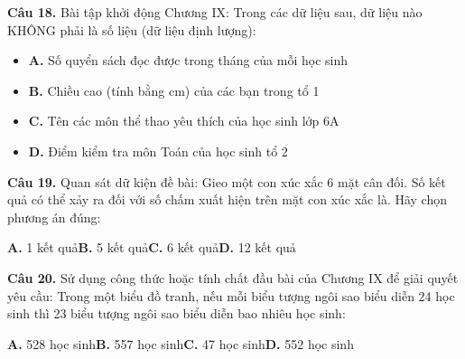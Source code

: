 \documentclass[11pt,a4paper]{article}
\begin{document}
\textbf{\color{primary} Câu 18.} Bài tập khởi động Chương IX: Trong các dữ liệu sau, dữ liệu nào KHÔNG phải là số liệu (dữ liệu định lượng):\par
\begin{itemize}\setlength{\itemsep}{1pt}\setlength{\parskip}{0pt}
  \item[] \textbf{A.} Số quyển sách đọc được trong tháng của mỗi học sinh
  \item[] \textbf{B.} Chiều cao (tính bằng cm) của các bạn trong tổ 1
  \item[] \textbf{C.} Tên các môn thể thao yêu thích của học sinh lớp 6A
  \item[] \textbf{D.} Điểm kiểm tra môn Toán của học sinh tổ 2
\end{itemize}\vspace{2pt}
\textbf{\color{primary} Câu 19.} Quan sát dữ kiện đề bài: Gieo một con xúc xắc 6 mặt cân đối. Số kết quả có thể xảy ra đối với số chấm xuất hiện trên mặt con xúc xắc là. Hãy chọn phương án đúng:\par
\hspace*{1.5em}\textbf{A.} 1 kết quả\quad\quad \textbf{B.} 5 kết quả\quad\quad \textbf{C.} 6 kết quả\quad\quad \textbf{D.} 12 kết quả\par\vspace{2pt}
\textbf{\color{primary} Câu 20.} Sử dụng công thức hoặc tính chất đầu bài của Chương IX để giải quyết yêu cầu: Trong một biểu đồ tranh, nếu mỗi biểu tượng ngôi sao biểu diễn 24 học sinh thì 23 biểu tượng ngôi sao biểu diễn bao nhiêu học sinh:\par
\hspace*{1.5em}\textbf{A.} 528 học sinh\quad\quad \textbf{B.} 557 học sinh\quad\quad \textbf{C.} 47 học sinh\quad\quad \textbf{D.} 552 học sinh\par\vspace{2pt}
\end{document}
